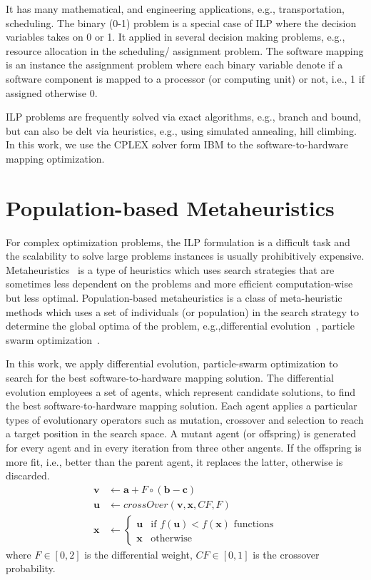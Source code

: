 It has many mathematical, and engineering applications, e.g., transportation, scheduling. The binary (0-1) problem is a special case of ILP where the decision variables takes on 0 or 1. It applied in several decision making problems, e.g., resource allocation in the scheduling/ assignment problem. The software mapping is an instance the assignment problem where each binary variable denote if a software component is mapped to a  processor (or computing unit) or not, i.e., 1 if assigned otherwise 0. 

ILP problems are frequently solved via exact algorithms, e.g., branch and bound, but can also be delt via heuristics, e.g., using simulated annealing, hill climbing. In this work, we use the CPLEX solver form IBM to the software-to-hardware mapping optimization.
\section{Population-based Metaheuristics}
For complex optimization problems, the ILP formulation is a difficult task and the scalability to solve large problems instances is usually prohibitively expensive. Metaheuristics~\cite{2006HandbookMetaheuristics}\cite{Gonzalez2007HandbookMetaheuristics} is a type of heuristics which uses search strategies that are sometimes less dependent on the problems and more efficient computation-wise but less optimal. Population-based metaheuristics is a class of meta-heuristic methods which uses a set of individuals (or population) in the search strategy to determine the global optima of the problem, e.g.,differential evolution~\cite{Storn1997DifferentialSpaces}\cite{Das2016RecentSurvey}, particle swarm optimization~\cite{2016ParticleOptimization}\cite{Sengupta2018ParticlePerspectivesb}.

In this work, we apply differential evolution, particle-swarm optimization to search for the best software-to-hardware mapping solution. The differential evolution employees a set of agents, which represent candidate solutions,  to find the best software-to-hardware mapping solution. Each agent applies a particular types of evolutionary operators such as mutation, crossover and selection to reach a target position in the search space. A mutant agent (or offspring) is generated for every agent and in every iteration from three other angents. If the offspring is more fit, i.e., better than the parent agent, it replaces the latter, otherwise is discarded.
\begin{align}
\label{eqn_de_mutation}
\textbf{v} & \leftarrow   \textbf{a} + F\circ(\textbf{b}-\textbf{c})\\
\label{eqn_de_crossover}
\textbf{u}&\leftarrow crossOver(\textbf{v},\textbf{x},CF,F)\\
\label{eqn_de_selection}
\textbf{x} &\leftarrow 
\begin{cases}
	\textbf{u} & \mbox{if } f(\textbf{u}) < f(\textbf{x})\mbox{ functions}\\
	\textbf{x} & \mbox{otherwise }
\end{cases}
\end{align}
where $F\in[0,2]$ is the differential weight, $CF\in[0,1]$ is the crossover probability.


